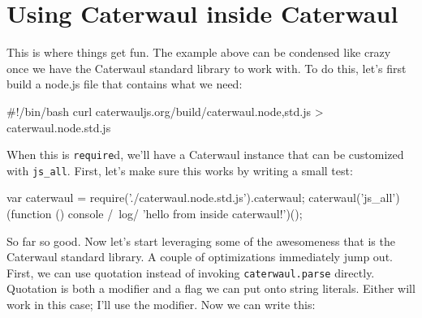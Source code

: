 \documentclass{report}
\begin{document}

\section{Using Caterwaul inside Caterwaul}
    This is where things get fun. The example above can be condensed like crazy once we have the Caterwaul standard library to work with. To do this, let's first build a node.js file that
    contains what we need:

\begin{resourcecode}
#!/bin/bash
curl caterwauljs.org/build/caterwaul.{node,std}.js > caterwaul.node.std.js \end{resourcecode}

    When this is {\tt require}d, we'll have a Caterwaul instance that can be customized with \verb|js_all|. First, let's make sure this works by writing a small test:

\begin{resourcecode}
var caterwaul = require('./caterwaul.node.std.js').caterwaul;
caterwaul('js_all')(function () {
  console /~log/ 'hello from inside caterwaul!'})(); \end{resourcecode}

    So far so good. Now let's start leveraging some of the awesomeness that is the Caterwaul standard library. A couple of optimizations immediately jump out. First, we can use quotation
    instead of invoking {\tt caterwaul.parse} directly. Quotation is both a modifier and a flag we can put onto string literals. Either will work in this case; I'll use the modifier. Now we
    can write this:
\end{document}
